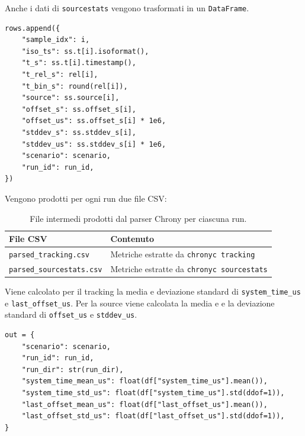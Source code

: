 Anche i dati di \texttt{sourcestats} vengono trasformati in un
\texttt{DataFrame}.

\begin{listing}[H]
\begin{verbatim}
rows.append({
    "sample_idx": i,
    "iso_ts": ss.t[i].isoformat(),
    "t_s": ss.t[i].timestamp(),
    "t_rel_s": rel[i],
    "t_bin_s": round(rel[i]),
    "source": ss.source[i],
    "offset_s": ss.offset_s[i],
    "offset_us": ss.offset_s[i] * 1e6,
    "stddev_s": ss.stddev_s[i],
    "stddev_us": ss.stddev_s[i] * 1e6,
    "scenario": scenario,
    "run_id": run_id,
})
\end{verbatim}
\caption{Costruzione del dataset Chrony per le metriche di \texttt{sourcestats}.}
\label{lst:chrony-build-sourcestats-df}
\end{listing}

Vengono prodotti per ogni run due file CSV:

\begin{table}[H]
  \centering
  \begin{tabular}{ll}
    \hline
    \textbf{File CSV} & \textbf{Contenuto} \\
    \hline
    \texttt{parsed\_tracking.csv} & Metriche estratte da \texttt{chronyc tracking} \\
    \texttt{parsed\_sourcestats.csv} & Metriche estratte da \texttt{chronyc sourcestats} \\
    \hline
  \end{tabular}
  \caption{File intermedi prodotti dal parser Chrony per ciascuna run.}
  \label{tab:chrony-csv-per-run}
\end{table}

Viene calcolato per il tracking la media e deviazione standard di
\texttt{system\_time\_us} e \texttt{last\_offset\_us}.
Per la source viene calcolata la media e e la deviazione standard di \texttt{offset\_us} e
\texttt{stddev\_us}.

\begin{listing}[H]
\begin{verbatim}
out = {
    "scenario": scenario,
    "run_id": run_id,
    "run_dir": str(run_dir),
    "system_time_mean_us": float(df["system_time_us"].mean()),
    "system_time_std_us": float(df["system_time_us"].std(ddof=1)),
    "last_offset_mean_us": float(df["last_offset_us"].mean()),
    "last_offset_std_us": float(df["last_offset_us"].std(ddof=1)),
}
\end{verbatim}
\caption{Esempio di riepilogo per-run delle metriche di tracking Chrony.}
\label{lst:chrony-tracking-summary}
\end{listing}

